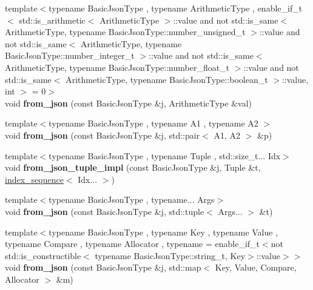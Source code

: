 \begin{DoxyCompactItemize}
\item 
\mbox{\label{namespacenlohmann_1_1detail_a839b0ab50d2c9bce669068f56bc41202}} 
{\footnotesize template$<$typename Basic\+Json\+Type , typename Arithmetic\+Type , enable\+\_\+if\+\_\+t$<$ std\+::is\+\_\+arithmetic$<$ Arithmetic\+Type $>$\+::value and not std\+::is\+\_\+same$<$ Arithmetic\+Type, typename Basic\+Json\+Type\+::number\+\_\+unsigned\+\_\+t $>$\+::value and not std\+::is\+\_\+same$<$ Arithmetic\+Type, typename Basic\+Json\+Type\+::number\+\_\+integer\+\_\+t $>$\+::value and not std\+::is\+\_\+same$<$ Arithmetic\+Type, typename Basic\+Json\+Type\+::number\+\_\+float\+\_\+t $>$\+::value and not std\+::is\+\_\+same$<$ Arithmetic\+Type, typename Basic\+Json\+Type\+::boolean\+\_\+t $>$\+::value, int $>$  = 0$>$ }\\void {\bfseries from\+\_\+json} (const Basic\+Json\+Type \&j, Arithmetic\+Type \&val)
\item 
\mbox{\label{namespacenlohmann_1_1detail_aae9f9c2601074e323d49428132cc293d}} 
{\footnotesize template$<$typename Basic\+Json\+Type , typename A1 , typename A2 $>$ }\\void {\bfseries from\+\_\+json} (const Basic\+Json\+Type \&j, std\+::pair$<$ A1, A2 $>$ \&p)
\item 
\mbox{\label{namespacenlohmann_1_1detail_a28253915d9db4a0112d60eaee0422949}} 
{\footnotesize template$<$typename Basic\+Json\+Type , typename Tuple , std\+::size\+\_\+t... Idx$>$ }\\void {\bfseries from\+\_\+json\+\_\+tuple\+\_\+impl} (const Basic\+Json\+Type \&j, Tuple \&t, \hyperlink{structnlohmann_1_1detail_1_1index__sequence}{index\+\_\+sequence}$<$ Idx... $>$)
\item 
\mbox{\label{namespacenlohmann_1_1detail_a8b99ec9b29f3f20a18fc4281fb784e49}} 
{\footnotesize template$<$typename Basic\+Json\+Type , typename... Args$>$ }\\void {\bfseries from\+\_\+json} (const Basic\+Json\+Type \&j, std\+::tuple$<$ Args... $>$ \&t)
\item 
\mbox{\label{namespacenlohmann_1_1detail_ae93147a54d2740228ef16a5e6210ca3e}} 
{\footnotesize template$<$typename Basic\+Json\+Type , typename Key , typename Value , typename Compare , typename Allocator , typename  = enable\+\_\+if\+\_\+t$<$not std\+::is\+\_\+constructible$<$			typename Basic\+Json\+Type\+::string\+\_\+t, Key$>$\+::value$>$$>$ }\\void {\bfseries from\+\_\+json} (const Basic\+Json\+Type \&j, std\+::map$<$ Key, Value, Compare, Allocator $>$ \&m)

\end{DoxyCompactItemize}
